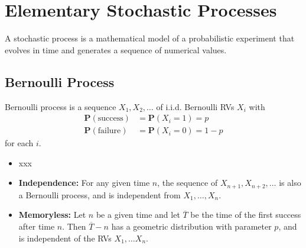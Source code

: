 \documentclass[device=normal, lang=en]{elegantbook}
\numberwithin{equation}{section}
\begin{document}
\chapter{Elementary Stochastic Processes}
\begin{definition}
    A stochastic process is a mathematical model of a probabilistic experiment that evolves in time and generates a sequence of numerical values.
\end{definition}


\section{Bernoulli Process}
\begin{definition}
    Bernoulli process is a sequence $X_1, X_2, \ldots$ of i.i.d. Bernoulli RVs $X_i$ with
    \begin{equation}
    \begin{aligned}
        \mathbf{P}(\text{success}) &= \mathbf{P}(X_i = 1) = p \\ 
        \mathbf{P}(\text{failure}) &= \mathbf{P}(X_i = 0) = 1 - p 
    \end{aligned}
    \end{equation}
    for each $i$.
\end{definition}
\begin{example}
    \begin{itemize}
        \item xxx
    \end{itemize}
\end{example}
\begin{property}
    \begin{itemize}
        \item \textbf{Independence:} For any given time $n$, the sequence of $X_{n+1}, X_{n+2}, \ldots$ is also a Bernoulli process, and is independent from $X_1, \ldots , X_n$.
        \item \textbf{Memoryless:}  Let $n$ be a given time and let $\overline{T}$ be the time of the first success after time $n$. Then $\overline{T} - n$ has a geometric distribution with parameter $p$, and is independent of the RVs $X_1, \ldots X_n$.
    \end{itemize}
\end{property}


\appendix

\end{document}
